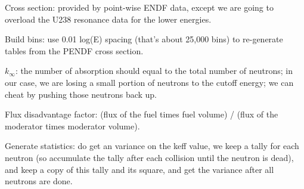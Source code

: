\documentclass{school-22.211-notes}
\begin{document}
Cross section: provided by point-wise ENDF data, except we are going to overload the U238 resonance data for the lower energies.

Build bins: use 0.01 log(E) spacing (that's about 25,000 bins) to re-generate tables from the PENDF cross section. 

$k_{\infty}$: the number of absorption should equal to the total number of neutrons; in our case, we are losing a small portion of neutrons to the cutoff energy; we can cheat by pushing those neutrons back up. 

Flux disadvantage factor: (flux of the fuel times fuel volume) / (flux of the moderator times moderator volume). 

Generate statistics: do get an variance on the keff value, we keep a tally for each neutron (so accumulate the tally after each collision until the neutron is dead), and keep a copy of this tally and its square, and get the variance after all neutrons are done. 
\end{document}
